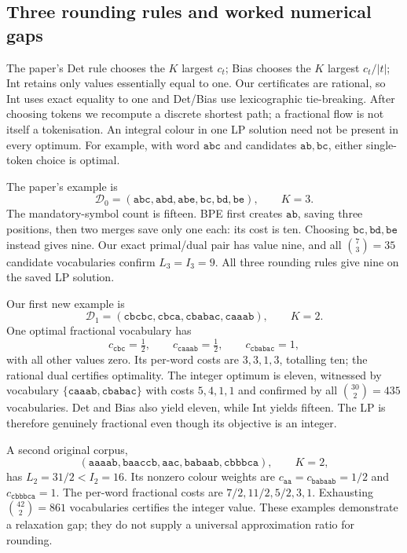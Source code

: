 \subsection{Three rounding rules and worked numerical gaps}
The paper's Det rule chooses the $K$ largest $c_t$; Bias chooses the
$K$ largest $c_t/|t|$; Int retains only values essentially equal to one.
Our certificates are rational, so Int uses exact equality to one and
Det/Bias use lexicographic tie-breaking. After choosing tokens we
recompute a discrete shortest path; a fractional flow is not itself a
tokenisation. An integral colour in one LP solution need not be present
in every optimum. For example, with word $\mathtt{abc}$ and candidates
$\mathtt{ab},\mathtt{bc}$, either single-token choice is optimal.

The paper's example is
\[
 \mathcal D_0=(\mathtt{abc},\mathtt{abd},\mathtt{abe},
              \mathtt{bc},\mathtt{bd},\mathtt{be}),\qquad K=3.
\]
The mandatory-symbol count is fifteen. BPE first creates $\mathtt{ab}$,
saving three positions, then two merges save only one each: its cost is
ten. Choosing $\mathtt{bc},\mathtt{bd},\mathtt{be}$ instead gives nine.
Our exact primal/dual pair has value nine, and all $\binom73=35$
candidate vocabularies confirm $L_3=I_3=9$. All three rounding rules give
nine on the saved LP solution.

Our first new example is
\[
 \mathcal D_1=(\mathtt{cbcbc},\mathtt{cbca},
              \mathtt{cbabac},\mathtt{caaab}),\qquad K=2.
\]
One optimal fractional vocabulary has
\[
 c_{\mathtt{cbc}}=\tfrac12,\qquad
 c_{\mathtt{caaab}}=\tfrac12,\qquad
 c_{\mathtt{cbabac}}=1,
\]
with all other values zero. Its per-word costs are $3,3,1,3$, totalling
ten; the rational dual certifies optimality. The integer optimum is
eleven, witnessed by vocabulary
$\{\mathtt{caaab},\mathtt{cbabac}\}$ with costs $5,4,1,1$ and confirmed
by all $\binom{30}{2}=435$ vocabularies. Det and Bias also yield eleven,
while Int yields fifteen. The LP is therefore genuinely fractional even
though its objective is an integer.

A second original corpus,
\[
 (\mathtt{aaaab},\mathtt{baaccb},\mathtt{aac},
   \mathtt{babaab},\mathtt{cbbbca}),\qquad K=2,
\]
has $L_2=31/2<I_2=16$. Its nonzero colour weights are
$c_{\mathtt{aa}}=c_{\mathtt{babaab}}=1/2$ and
$c_{\mathtt{cbbbca}}=1$. The per-word fractional costs are
$7/2,11/2,5/2,3,1$. Exhausting $\binom{42}{2}=861$ vocabularies certifies
the integer value. These examples demonstrate a relaxation gap; they do
not supply a universal approximation ratio for rounding.

